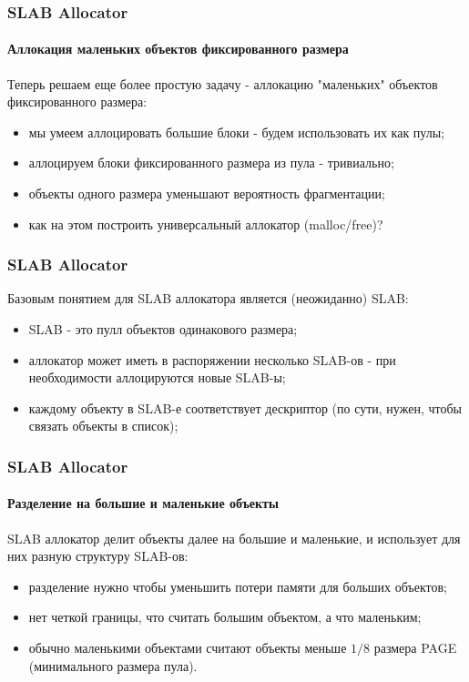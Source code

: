 \begin{frame}
\frametitle{SLAB Allocator}
\framesubtitle{Аллокация маленьких объектов фиксированного размера}

Теперь решаем еще более простую задачу - аллокацию "маленьких" объектов фиксированного размера:
\begin{itemize}
  \item мы умеем аллоцировать большие блоки - будем использовать их как пулы;
  \item аллоцируем блоки фиксированного размера из пула - тривиально;
  \item объекты одного размера уменьшают вероятность фрагментации;
  \item как на этом построить универсальный аллокатор (malloc/free)?
\end{itemize}

\end{frame}

\begin{frame}
\frametitle{SLAB Allocator}

Базовым понятием для SLAB аллокатора является (неожиданно) SLAB:
\begin{itemize}
  \item SLAB - это пулл объектов одинакового размера;
  \item аллокатор может иметь в распоряжении несколько SLAB-ов - при необходимости аллоцируются новые SLAB-ы;
  \item каждому объекту в SLAB-е соответствует дескриптор (по сути, нужен, чтобы связать объекты в список);
\end{itemize}
\end{frame}

\begin{frame}
\frametitle{SLAB Allocator}
\framesubtitle{Разделение на большие и маленькие объекты}

SLAB аллокатор делит объекты далее на большие и маленькие, и использует для них разную структуру SLAB-ов:
\begin{itemize}
  \item разделение нужно чтобы уменьшить потери памяти для больших объектов;
  \item нет четкой границы, что считать большим объектом, а что маленьким;
  \item обычно маленькими объектами считают объекты меньше $1/8$ размера PAGE (минимального размера пула).
\end{itemize}

\end{frame}


